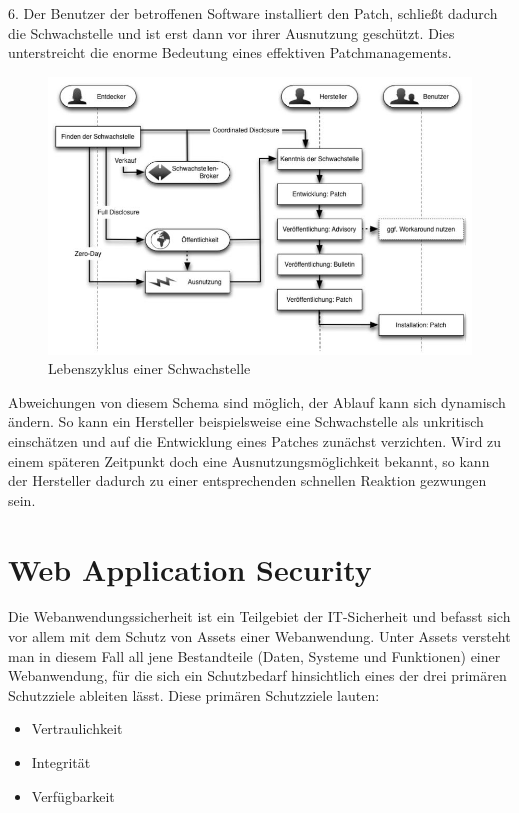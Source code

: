 \documentclass[12pt,oneside,a4paper,parskip]{scrbook}
\begin{document}
  6. Der Benutzer der betroffenen Software installiert den Patch, schließt dadurch die Schwachstelle und ist erst dann vor ihrer Ausnutzung geschützt. Dies unterstreicht die enorme Bedeutung eines effektiven Patchmanagements.
  \begin{figure}[hbt!]
    \centering
     \includegraphics[width=1\textwidth]{Images/Lebenszyklus}
    \caption[Lebenszyklus einer Schwachstelle]{Lebenszyklus einer Schwachstelle \cite{BSI3}}
  \end{figure}

  Abweichungen von diesem Schema sind möglich, der Ablauf kann sich dynamisch ändern. So
  kann ein Hersteller beispielsweise eine Schwachstelle als unkritisch einschätzen und auf die
  Entwicklung eines Patches zunächst verzichten. Wird zu einem späteren Zeitpunkt doch eine
  Ausnutzungsmöglichkeit bekannt, so kann der Hersteller dadurch zu einer entsprechenden
  schnellen Reaktion gezwungen sein. \cite{BSI3}

  \section{Web Application Security}
  Die Webanwendungssicherheit ist ein Teilgebiet der IT-Sicherheit und befasst sich vor allem mit dem Schutz von Assets einer Webanwendung. Unter Assets versteht man in diesem Fall all jene Bestandteile
  (Daten, Systeme und Funktionen) einer Webanwendung, für die sich ein Schutzbedarf hinsichtlich eines der
  drei primären Schutzziele ableiten lässt.
  Diese primären Schutzziele lauten:
    \begin{itemize}
    \item Vertraulichkeit
    \item Integrität
    \item Verfügbarkeit
  \end{itemize}
\end{document}
